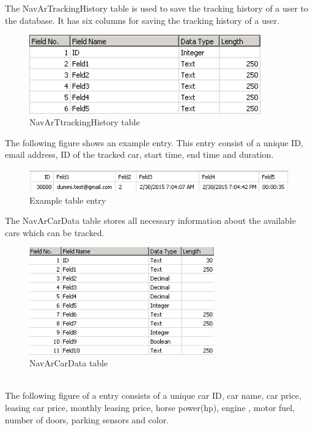 The NavArTrackingHistory table is used to save the tracking history of a user to the database. It has six columns for saving the tracking history of a user.
\newline
\begin{figure}[htbp]
\centering
\includegraphics[width=100mm,height=\textheight,keepaspectratio]{graphics/trackingtable.png}
\caption{NavArTtrackingHistory table}
\end{figure}
\newline
  The following figure shows an example entry. This entry consist of a unique ID, email address, ID of the tracked car, start time, end time and duration.  
\begin{figure}[htbp]
\centering
\includegraphics[width=\textwidth,height=\textheight,keepaspectratio]{graphics/trackingtableexample.png}
\caption{Example table entry}
\end{figure}
\newpage
The NavArCarData table stores all necessary information about the available cars which can be tracked.
\begin{figure}[htbp]
\centering
\includegraphics[width=80mm,height=\textheight,keepaspectratio]{graphics/cardatatable.png}
\caption{NavArCarData table}
\end{figure}
\\
The following figure of a entry consists of a unique car ID, car name, car price, leasing car price, monthly leasing price, horse power(hp), engine , motor fuel, number of doors, parking sensors and color. 
\newline  
